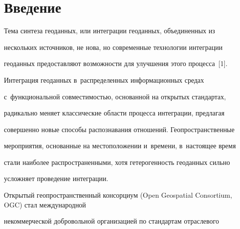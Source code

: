   












 \thispagestyle{headings}


 


 \vspace*{-18pt}


      


  \section{Введение}


  


  \vspace*{-3pt}


  


  Тема синтеза геоданных, или интеграции геоданных, объединенных из 


нескольких источников, не нова, но современные технологии интеграции 


геоданных предостав\-ля\-ют возможности для улучшения этого процесса~[1]. 


Интеграция геоданных в~распределенных информационных средах 


с~функциональной со\-вмес\-ти\-мостью, основанной на открытых стандартах, 


радикально меняет классические области процесса интеграции, предлагая 


совершенно новые способы распознавания отношений. Геопространственные 


мероприятия, основанные на местоположении и~времени, в~на\-сто\-ящее время 


стали наиболее распространенными, хотя ге\-те\-ро\-ген\-ность геоданных сильно 


услож\-ня\-ет проведение интеграции. 


  


  Открытый геопространственный консорциум (Open Geospatial Consortium, OGC) стал международной 


некоммерческой добровольной организацией по стандартам отраслевого 


